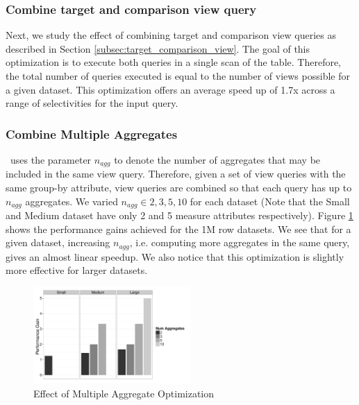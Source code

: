 \subsubsection{Combine target and comparison view query}
Next, we study the effect of combining target and comparison view queries as
described in Section \ref{subsec:target_comparison_view}. The goal of this
optimization is to execute both queries in a single scan of the table.
Therefore, the total number of queries executed is equal to the number of
views possible for a given dataset. This optimization offers an average speed up
of 1.7x across a range of selectivities for the input query.

\subsubsection{Combine Multiple Aggregates}
\SeeDB\ uses the parameter $n_{agg}$ to denote the number of aggregates that may
be included in the same view query. Therefore, given a set of view queries with
the same group-by attribute, view queries are combined so that each query has up
to $n_{agg}$ aggregates. We varied $n_{agg} \in {2, 3, 5, 10}$ for each dataset
(Note that the Small and Medium dataset have only 2 and 5 measure attributes
respectively).
Figure \ref{fig:mult_agg} shows the performance gains achieved for the 1M row
datasets. We see that for a given dataset, increasing $n_{agg}$, i.e. computing
more aggregates in the same query, gives an almost linear speedup. We also
notice that this optimization is slightly more effective for larger datasets.

\begin{figure}[h]

  \centering
    \includegraphics[width=6cm]{Images/mult_agg.pdf}
    \caption{Effect of Multiple Aggregate Optimization} 
      \label{fig:mult_agg}
\end{figure}


